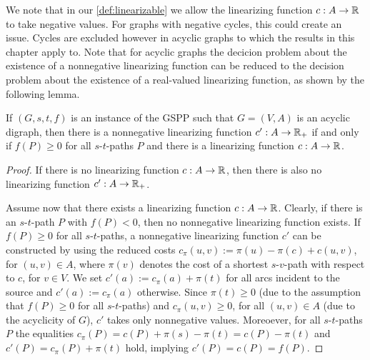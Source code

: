 We note that in our \cref{def:linearizable} we allow the linearizing function $c : A \to \mathbb{R}$ to  take negative values. For graphs with negative cycles, this could create an issue. Cycles are excluded however in acyclic graphs to which the results in this chapter apply to.
Note that for acyclic graphs
the decicion problem  about the existence of a nonnegative linearizing function can be reduced to the decision problem about the existence of a real-valued  linearizing function, as shown by the following lemma.  
\begin{lemma}
If $(G,s,t,f)$ is an instance of the GSPP such that $G  = (V,A)$ is an acyclic digraph, then there is a nonnegative linearizing function $c' : A \to \mathbb{R}_+$ if and only if $f(P) \geq 0$ for all $s$-$t$-paths $P$ and there is a linearizing function $c : A \to \mathbb{R}$.
\end{lemma}
\begin{proof}
If there is no linearizing function $c : A \to \mathbb{R}$, then there is also no linearizing function $c' : A \to \mathbb{R}_+$.

Assume now that 
there exists  a linearizing function $c : A \to \mathbb{R}$. Clearly, if  there is an $s$-$t$-path $P$ with $f(P) < 0$, then no nonnegative linearizing function exists. 
 If  $f(P) \geq 0$ for all $s$-$t$-paths,  a nonnegative linearizing function  $c'$ can be constructed by using the reduced costs $c_\pi(u,v) := \pi(u) - \pi(c) + c(u,v)$, for $(u,v) \in A$, where $\pi(v)$ denotes  the cost of a shortest $s$-$v$-path with respect to $c$, for $v\in V$.  We set  $c'(a) := c_\pi (a) + \pi(t)$ for all arcs incident to the source and $c'(a) := c_\pi(a)$ otherwise.  Since $\pi(t) \geq 0$ (due to the assumption that $f(P)\ge 0$ for all $s$-$t$-paths) and $c_\pi(u,v)\ge 0$, for all $(u,v) \in A$ (due to the acyclicity of $G$), $c'$  takes only nonnegative values.    Moreoever, for all $s$-$t$-paths $P$ the equalities  $c_\pi(P) = c(P) + \pi(s) - \pi(t) = c(P) - \pi(t)$ and $c'(P)=c_\pi(P)+\pi(t)$ hold, implying   $c'(P)=c(P)=f(P)$.
\end{proof}
